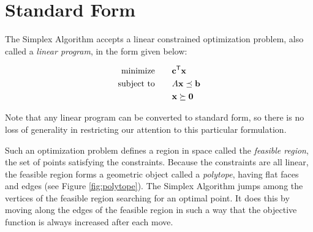 \label{lab:Simplex}


\section*{Standard Form} %

The Simplex Algorithm accepts a linear constrained optimization problem, also called a \emph{linear program}, in the form given below:

\begin{align*}
\text{minimize}\qquad &\mathbf{c}^{\mathsf T}\mathbf{x} \\
\text{subject to}\qquad & A\mathbf{x} \preceq \mathbf{b} \\
 &\mathbf{x} \succeq \mathbf{0}
\end{align*}

Note that any linear program can be converted to standard form, so there is no loss of generality in restricting our attention to this particular formulation.

Such an optimization problem defines a region in space called the \emph{feasible region}, the set of points satisfying the constraints.
Because the constraints are all linear, the feasible region forms a geometric object called a \emph{polytope}, having flat faces and edges (see Figure \ref{fig:polytope}).
The Simplex Algorithm jumps among the vertices of the feasible region searching for an optimal point.
It does this by moving along the edges of the feasible region in such a way that the objective function is always increased after each move.

